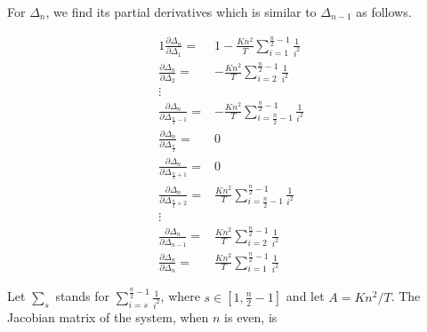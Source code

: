 For $\Delta_{n}$, we find its partial derivatives which is similar to $\Delta_{n-1}$ as follows.

\begin{alignat}{1}
{\frac{\partial \Delta_{n}}{\partial \Delta_{1}}} =& 1-\frac{Kn^2}{T} \sum\limits_{i=1}^{\frac{n}{2}-1}{\frac{1}{i^2}} \nonumber \\
{\frac{\partial \Delta_{n}}{\partial \Delta_{2}}} =& -\frac{Kn^2}{T} \sum\limits_{i=2}^{\frac{n}{2}-1}{\frac{1}{i^2}} \nonumber \\
\vdots \nonumber \\
{\frac{\partial \Delta_{n}}{\partial \Delta_{\frac{n}{2}-1}}} =& -\frac{Kn^2}{T} \sum\limits_{i=\frac{n}{2}-1}^{\frac{n}{2}-1}{\frac{1}{i^2}} \nonumber \\	
{\frac{\partial \Delta_{n}}{\partial \Delta_{\frac{n}{2}}}} =& 0 \nonumber \\
{\frac{\partial \Delta_{n}}{\partial \Delta_{\frac{n}{2}+1}}} =& 0 \nonumber \\
{\frac{\partial \Delta_{n}}{\partial \Delta_{\frac{n}{2}+2}}} =& \frac{Kn^2}{T} \sum\limits_{i=\frac{n}{2}-1}^{\frac{n}{2}-1}{\frac{1}{i^2}} \nonumber \\	
\vdots \nonumber \\
{\frac{\partial \Delta_{n}}{\partial \Delta_{n-1}}} =& \frac{Kn^2}{T} \sum\limits_{i=2}^{\frac{n}{2}-1}{\frac{1}{i^2}} \nonumber \\
{\frac{\partial \Delta_{n}}{\partial \Delta_{n}}} =& \frac{Kn^2}{T} \sum\limits_{i=1}^{\frac{n}{2}-1}{\frac{1}{i^2}} \nonumber 
\end{alignat}

Let $\sum\limits_{s}$ stands for $\sum\limits_{i=s}^{\frac{n}{2}-1}{\frac{1}{i^2}}$, where $s \in [1,\frac{n}{2}-1]$ and let $A = Kn^2/T$.
The Jacobian matrix of the system, when $n$ is even, is

